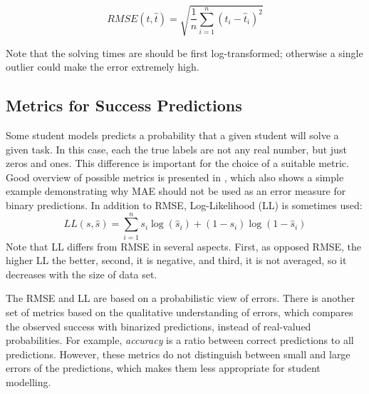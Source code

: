 $$
RMSE(t, \hat{t}) = \sqrt{\frac{1}{n} \sum_{i=1}^n (t_i - \hat{t}_i)^2}
$$

Note that the solving times are should be first log-transformed;
  otherwise a single outlier could make the error extremely high.




\subsection{Metrics for Success Predictions}

Some student models predicts a probability that
  a given student will solve a given task.
In this case, each the true labels are not any real number,
  but just zeros and ones.
This difference is important for the choice of a suitable metric.
Good overview of possible metrics is presented in \cite{pelanek-evaluation-student-models},
  which also shows a simple example demonstrating why MAE should not be used
  as an error measure for binary predictions.
In addition to RMSE, Log-Likelihood (LL) is sometimes used:
$$
LL(s, \hat{s}) = \sum_{i=1}^n s_i\log(\hat{s}_i) + (1-s_i)\log(1-\hat{s}_i)
$$
Note that LL differs from RMSE in several aspects.
First, as opposed RMSE, the higher LL the better,
second, it is negative,
and third, it is not averaged, so it decreases with the size of data set.

The RMSE and LL are based on a probabilistic view of errors.
There is another set of metrics based on the qualitative understanding of errors,
  which compares the observed success with binarized predictions,
  instead of real-valued probabilities.
For example, \emph{accuracy} is a ratio between correct predictions to all predictions.
However, these metrics do not distinguish between small and large errors of the predictions,
  which makes them less appropriate for student modelling.


